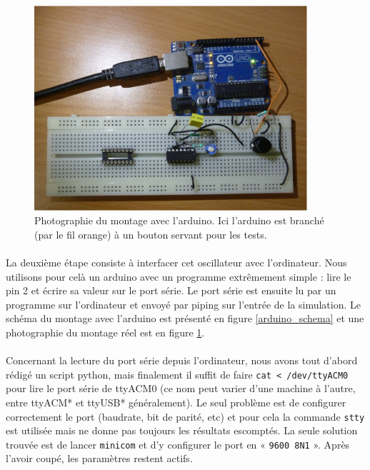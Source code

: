 \documentclass{article}
\begin{document}
\begin{figure}[h]
\centering
\includegraphics[width=0.9\textwidth,height=0.9\textheight,keepaspectratio]{arduino.jpg.eps}
\caption{\label{arduino_photo} Photographie du montage avec l'arduino. Ici l'arduino est branché (par le fil orange) à un bouton servant pour les tests.}
\end{figure}

\paragraph{}La deuxième étape consiste à interfacer cet oscillateur avec l'ordinateur. Nous utilisons pour celà un arduino avec un programme extrêmement simple : lire le pin 2 et écrire sa valeur sur le port série. Le port série est ensuite lu par un programme sur l'ordinateur et envoyé par piping sur l'entrée de la simulation. Le schéma du montage avec l'arduino est présenté en figure \ref{arduino_schema} et une photographie du montage réel est en figure \ref{arduino_photo}.

\paragraph{}Concernant la lecture du port série depuis l'ordinateur, nous avons tout d'abord rédigé un script python, mais finalement il suffit de faire \texttt{cat < /dev/ttyACM0} pour lire le port série de ttyACM0 (ce nom peut varier d'une machine à l'autre, entre ttyACM* et ttyUSB* généralement). Le seul problème est de configurer correctement le port (baudrate, bit de parité, etc) et pour cela la commande \texttt{stty} est utilisée mais ne donne pas toujours les résultats escomptés. La seule solution trouvée est de lancer \texttt{minicom} et d'y configurer le port en « \texttt{9600 8N1} ». Après l'avoir coupé, les paramètres restent actifs.
\end{document}
